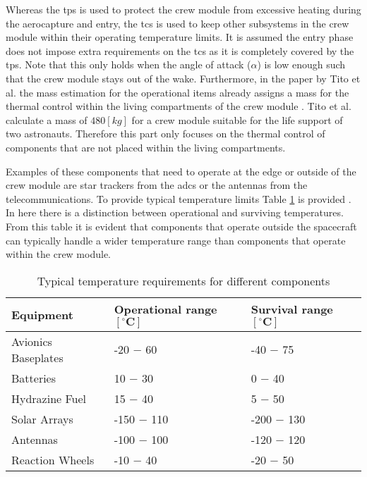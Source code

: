 Whereas the \acrfull{tps} is used to protect the crew module from excessive heating during the aerocapture and entry, the \acrfull{tcs} is used to keep other subsystems in the crew module within their operating temperature limits. It is assumed the entry phase does not impose extra requirements on the \gls{tcs} as it is completely covered by the \gls{tps}. Note that this only holds when the angle of attack ($\alpha$) is low enough such that the crew module stays out of the wake. Furthermore, in the paper by Tito et al. the mass estimation for the operational items already assigns a mass for the thermal control within the living compartments of the crew module \cite{Tito2013}. Tito et al. calculate a mass of $480 \left[kg\right]$ for a crew module suitable for the life support of two astronauts. Therefore this part only focuses on the thermal control of components that are not placed within the living compartments.

Examples of these components that need to operate at the edge or outside of the crew module are star trackers from the \gls{adcs} or the antennas from the telecommunications. To provide typical temperature limits Table \ref{tab:cmtherm} is provided \cite[p.686]{Wertz2011}. In here there is a distinction between operational and surviving temperatures. From this table it is evident that components that operate outside the spacecraft can typically handle a wider temperature range than components that operate within the crew module.

\begin{table}[h]
	\centering
	\caption{Typical temperature requirements for different components}
	\begin{tabular}{|l||l|l|}
		\hline
		\textbf{Equipment} & \textbf{Operational range $\mathbf{[^{\circ}C]}$} & \textbf{Survival range $\mathbf{[^{\circ}C]}$}\\ \hline \hline
		Avionics Baseplates & -20 $-$ 60 & -40 $-$ 75 \\
		Batteries & 10 $-$ 30 & 0 $-$ 40 \\
		Hydrazine Fuel & 15 $-$ 40 & 5 $-$ 50 \\
		Solar Arrays & -150 $-$ 110 & -200 $-$ 130 \\
		Antennas & -100 $-$ 100 & -120 $-$ 120 \\
		Reaction Wheels & -10 $-$ 40 & -20 $-$ 50 \\
		\hline
	\end{tabular}
	\label{tab:cmtherm}
\end{table}

